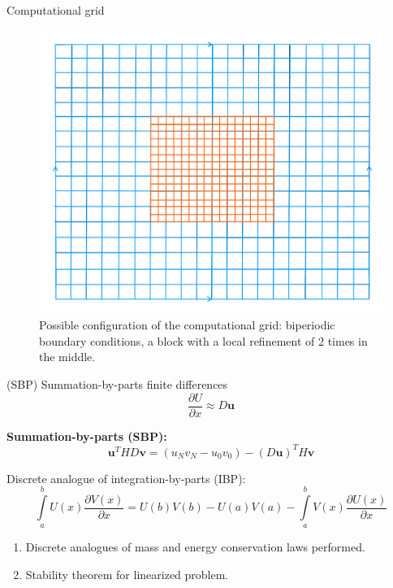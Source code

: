 \documentclass[10pt]{beamer}
\begin{document}
\begin{frame}{Computational grid}

\begin{figure}[h]
\centering
\includegraphics[width=0.8\linewidth]{./images/domain.png}
\caption{Possible configuration of the computational grid: biperiodic boundary conditions, a block with a local refinement of 2 times in the middle.}
\label{fig:mpr}
\end{figure}

\end{frame}



\begin{frame}{(SBP) Summation-by-parts finite differences}
$$\frac{\partial U}{\partial x}\approx D\textbf{u}$$

\textbf{Summation-by-parts (SBP):}
$$\textbf{u}^T HD \textbf{v} = (u_N v_N - u_0 v_0) -(D\textbf{u})^T H \textbf{v}$$

Discrete analogue of integration-by-parts (IBP):
$$\int\limits_{a}^bU(x)\frac{\partial V(x)}{\partial x}=U(b)V(b)-U(a)V(a)-\int\limits_{a}^b {V(x)\frac{\partial U(x)}{\partial x}}$$

\begin{enumerate}
 \item Discrete analogues of mass and energy conservation laws performed.
 \item Stability theorem for linearized problem.
\end{enumerate}
\end{frame}
\end{document}
